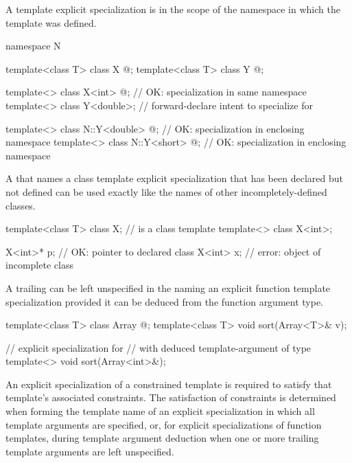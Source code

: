 \pnum
A template explicit specialization is in the scope of the namespace in which
the template was defined.
\begin{example}
\begin{codeblock}
namespace N {
  template<class T> class X { @\commentellip@ };
  template<class T> class Y { @\commentellip@ };

  template<> class X<int> { @\commentellip@ };        // OK: specialization in same namespace
  template<> class Y<double>;                   // forward-declare intent to specialize for 
}

template<> class N::Y<double> { @\commentellip@ };    // OK: specialization in enclosing namespace
template<> class N::Y<short> { @\commentellip@ };     // OK: specialization in enclosing namespace
\end{codeblock}
\end{example}

\pnum
A
that names a class template explicit specialization that has been declared but
not defined can be used exactly like the names of other incompletely-defined
classes.
\begin{example}
\begin{codeblock}
template<class T> class X;                      //  is a class template
template<> class X<int>;

X<int>* p;                                      // OK: pointer to declared class 
X<int> x;                                       // error: object of incomplete class 
\end{codeblock}
\end{example}

\pnum
A trailing
can be left unspecified in the
naming an explicit function template specialization
provided it can be deduced from the function argument type.
\begin{example}
\begin{codeblock}
template<class T> class Array { @\commentellip@ };
template<class T> void sort(Array<T>& v);

// explicit specialization for 
// with deduced template-argument of type 
template<> void sort(Array<int>&);
\end{codeblock}
\end{example}

\pnum
\begin{note}
An explicit specialization of a constrained template is required
to satisfy that template's associated constraints.
The satisfaction of constraints is determined
when forming the template name of an explicit specialization
in which all template arguments are specified,
or, for explicit specializations of function templates,
during template argument deduction
when one or more trailing template arguments are left unspecified.
\end{note}

